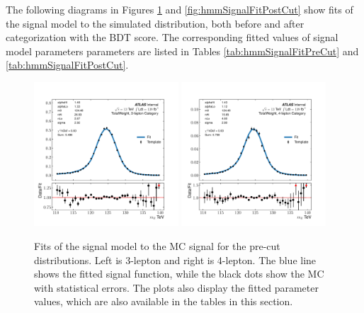 The following diagrams in Figures \ref{fig:hmmSignalFitPreCut} and \ref{fig:hmmSignalFitPostCut} show fits of the signal model to the simulated distribution, both before and after categorization with the BDT score.
The corresponding fitted values of signal model parameters parameters are listed in Tables \ref{tab:hmmSignalFitPreCut} and \ref{tab:hmmSignalFitPostCut}.

\begin{figure}[htpb]
  \centering
  \includegraphics[width=0.48\textwidth]{figures/hmm/signalFits/sigfit-cat3lep-TotalWeight.pdf}
  \includegraphics[width=0.48\textwidth]{figures/hmm/signalFits/sigfit-cat4lep-TotalWeight.pdf}
  \caption{Fits of the signal model to the MC signal for the pre-cut distributions. Left is 3-lepton and right is 4-lepton. The blue line shows the fitted signal function, while the black dots show the MC with statistical errors. The plots also display the fitted parameter values, which are also available in the tables in this section.}
    \label{fig:hmmSignalFitPreCut}
\end{figure}

